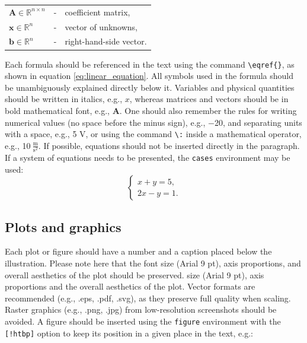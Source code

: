 \vspace*{0.5em}
\begin{tabular}{@{}lll}
  $\mathbf{A} \in \mathbb{R}^{n\times n}$ & - & coefficient matrix,     \\
  $\mathbf{x} \in \mathbb{R}^{n}$         & - & vector of unknowns,     \\
  $\mathbf{b} \in \mathbb{R}^{n}$         & - & right-hand-side vector.
\end{tabular}
\vspace*{0.5em}

\noindent Each formula should be referenced in the text using the command \verb|\eqref{}|, as shown in equation \eqref{eq:linear_equation}. All symbols used in the formula should be unambiguously explained directly below it. Variables and physical quantities should be written in italics, e.g., $x$, whereas matrices and vectors should be in bold mathematical font, e.g., $\mathbf{A}$. One should also remember the rules for writing numerical values (no space before the minus sign), e.g., $-$20, and separating units with a space, e.g., 5 V, or using the command \verb|\:| inside a mathematical operator, e.g., 10$\:  \frac{\mathrm{m}}{\mathrm{s^2}}$. If possible, equations should not be inserted directly in the paragraph. If a system of equations needs to be presented, the \verb|cases| environment may be used:
\begin{equation}
  \begin{cases}
    x + y = 5, \\
    2x - y = 1.
  \end{cases}
  \label{eq:uklad}
\end{equation}
\enlargethispage{\baselineskip}
\subsection{Plots and graphics}
Each plot or figure should have a number and a caption placed below the illustration. Please note here that the font size (Arial 9 pt), axis proportions, and overall aesthetics of the plot should be preserved. size (Arial 9 pt), axis proportions and the overall aesthetics of the plot. Vector formats are recommended (e.g., .eps, .pdf, .svg), as they preserve full quality when scaling. Raster graphics (e.g., .png, .jpg) from low-resolution screenshots should be avoided. A figure should be inserted using the \verb|figure| environment with the \verb|[!htbp]| option to keep its position in a given place in the text, e.g.:

